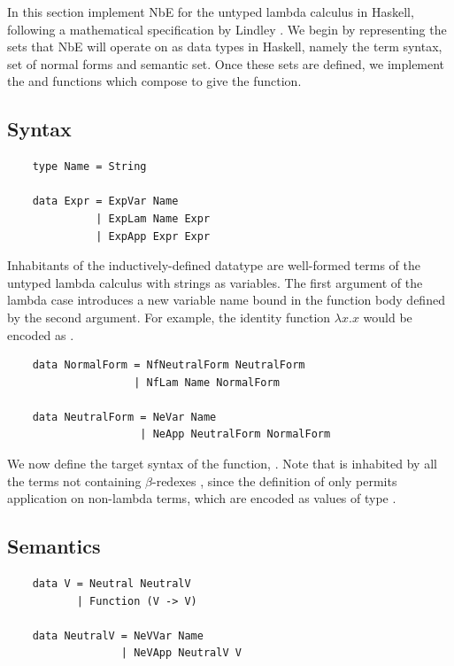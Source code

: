In this section implement NbE for the untyped lambda calculus in Haskell, following a mathematical specification by Lindley \cite{slides}. We begin by representing the sets that NbE will operate on as data types in Haskell, namely the term syntax, set of normal forms and semantic set. Once these sets are defined, we implement the  and  functions which compose to give the  function.

\subsection{Syntax}

\begin{lstlisting}
    type Name = String

    data Expr = ExpVar Name
              | ExpLam Name Expr
              | ExpApp Expr Expr
\end{lstlisting}

Inhabitants of the inductively-defined datatype  are well-formed terms of the untyped lambda calculus with strings as variables. The first argument of the lambda case introduces a new variable name bound in the function body defined by the second argument. For example, the identity function $\lambda x . x$ would be encoded as .

\begin{lstlisting}
    data NormalForm = NfNeutralForm NeutralForm
                    | NfLam Name NormalForm

    data NeutralForm = NeVar Name
                     | NeApp NeutralForm NormalForm
\end{lstlisting}

We now define the target syntax of the  function, . Note that  is inhabited by all the terms not containing $\beta$-redexes \cite{slides}, since the definition of  only permits application on non-lambda terms, which are encoded as values of type .

\subsection{Semantics}

\begin{lstlisting}
    data V = Neutral NeutralV
           | Function (V -> V)

    data NeutralV = NeVVar Name
                  | NeVApp NeutralV V
\end{lstlisting}

